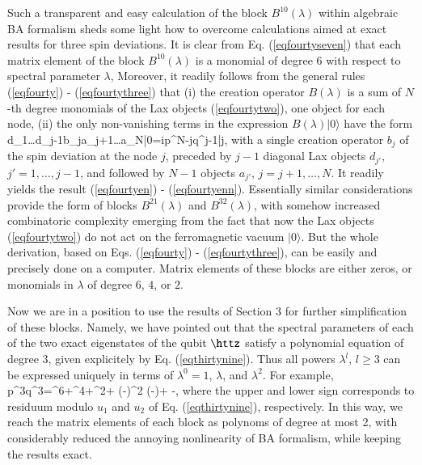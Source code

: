 \documentclass{elsarticle}
\begin{document}
Such a transparent and easy calculation of the block $B^{10}(\lambda)$ within algebraic BA formalism sheds some light how to overcome calculations aimed at exact results for three spin deviations. It is clear from Eq. (\ref{eqfourtyseven}) that each matrix element of the block $B^{10}(\lambda)$ is a monomial of degree 6 with respect to spectral parameter $\lambda$, Moreover, it readily follows from the general rules (\ref{eqfourty}) - (\ref{eqfourtythree}) that (i) the creation operator  $B(\lambda)$ is a sum of $N$-th degree monomials of the Lax objects (\ref{eqfourtytwo}), one object for each node, (ii) the only non-vanishing terms in the expression $B(\lambda)|0\rangle$ have the form
\be
\label{eqfiftyone}
d_1\ldots d_{j-1}b_ja_{j+1}\ldots a_N|0\rangle=ip^{N-j}q^{j-1}|j\rangle,
\ee
with a single creation operator $b_j$ of the spin deviation at the node $j$, preceded by $j-1$ diagonal Lax objects $d_{j'}$, $j'=1,\ldots,j-1$, and followed by $N-1$ objects $a_{j'}$, $j=j+1,\ldots,N$. It readily yields the result (\ref{eqfourtyen}) - (\ref{eqfourtyenn}). Essentially similar considerations provide the form of blocks $B^{21}(\lambda)$ and $B^{32}(\lambda)$, with somehow increased combinatoric complexity emerging from the fact that now the Lax objects (\ref{eqfourtytwo}) do not act on the ferromagnetic vacuum $|0\rangle$. But the whole derivation, based on Eqs. (\ref{eqfourty}) - (\ref{eqfourtythree}), can be easily and precisely done on a computer. Matrix elements of these blocks are either zeros, or monomials in $\lambda$ of degree $6$, $4$, or $2$.

Now we are in a position to use the results of Section 3 for further simplification of these blocks. Namely, we have pointed out that the spectral parameters of each of the two exact eigenstates of the qubit $\httz$ satisfy a polynomial equation of degree 3, given explicitely by Eq. (\ref{eqthirtynine}). Thus all powers $\lambda^l$, $l\geq 3$ can be expressed uniquely in terms of $\lambda^0=1$, $\lambda$, and $\lambda^2$. For example, 
\be
\label{eqfiftytwo}
p^3q^3=\lambda^6+\lambda^4+\lambda^2+\cong
\left(-\right)\lambda^2 \mp \left(-\right)\lambda + -,
\ee
where the upper and lower sign corresponds to residuum modulo $u_1$ and $u_2$ of Eq. (\ref{eqthirtynine}), respectively. In this way, we reach the matrix elements of each block as polynoms of degree at most 2, with considerably reduced the annoying nonlinearity of BA formalism, while keeping the results exact.
\end{document}
